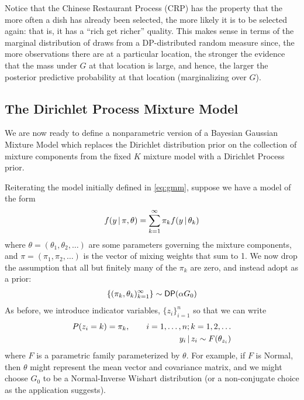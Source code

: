   Notice that the Chinese Restaurant Process (CRP) has the property
  that the more often a dish has already been selected, the more
  likely it is to be selected again: that is, it has a ``rich get
  richer'' quality.  This makes sense in terms of the marginal
  distribution of draws from a DP-distributed random measure since,
  the more observations there are at a particular location, the
  stronger the evidence that the mass under $G$ at that location is
  large, and hence, the larger the posterior predictive probability at
  that location (marginalizing over $G$).

  \subsection{The Dirichlet Process Mixture Model}

  We are now ready to define a nonparametric version of a Bayesian
  Gaussian Mixture Model which replaces the Dirichlet distribution
  prior on the collection of mixture components from the fixed $K$ mixture model 
  with a Dirichlet Process prior.

  Reiterating the model initially defined in \eqref{eq:gmm}, suppose
  we have a model of the form
  \begin{equation}
    \label{eq:gmm-2}
    f(y \, \vert \, \pi, \theta) = \sum_{k=1}^\infty \pi_k f(y \, \vert \, \theta_k)
  \end{equation}
  where $\theta = (\theta_1, \theta_2, \dots)$ are some parameters
  governing the mixture components, and $\pi = (\pi_1, \pi_2, \dots)$ is
  the vector of mixing weights that sum to 1.  We now drop the
  assumption that all but finitely many of the $\pi_k$ are zero, and
  instead adopt as a prior:
  \begin{align}
    \label{eq:DP-prior}
    \{(\pi_k, \theta_k)_{k=1}^\infty\} \sim \mathsf{DP}(\alpha G_0)
  \end{align}
  As before, we introduce indicator variables, $\{z_i\}_{i=1}^n$ so
  that we can write
  \begin{align}
    \label{eq:5}
    P(z_i = k) = \pi_k, \qquad i = 1, \dots, n; k = 1, 2, \dots \\
    y_i \, \vert \, z_i \sim F(\theta_{z_i})
  \end{align}
  where $F$ is a parametric family parameterized by $\theta$. For
  example, if $F$ is Normal, then $\theta$ might represent the mean
  vector and covariance matrix, and we might choose $G_0$ to be a
  Normal-Inverse Wishart distribution (or a non-conjugate choice as
  the application suggests).

